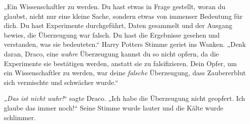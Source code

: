 „Ein Wissenschaftler zu werden. Du hast etwas in Frage gestellt, woran du glaubst, nicht nur eine kleine Sache, sondern etwas von immenser Bedeutung für dich. Du hast Experimente durchgeführt, Daten gesammelt und der Ausgang bewies, die Überzeugung war falsch. Du hast die Ergebnisse gesehen und verstanden, was sie bedeuteten.“ Harry Potters Stimme geriet ins Wanken.
„Denk daran, Draco, eine \emph{wahre} Überzeugung kannst du so nicht opfern, da die Experimente sie bestätigen werden, anstatt sie zu falsifizieren. Dein Opfer, um ein Wissenschaftler zu werden, war deine \emph{falsche} Überzeugung, dass Zaubererblut sich vermischte und schwächer wurde.“

„\emph{Das ist nicht wahr!}“ sagte Draco.
„Ich habe die Überzeugung nicht geopfert. Ich glaube das immer noch!“ Seine Stimme wurde lauter und die Kälte wurde schlimmer.


